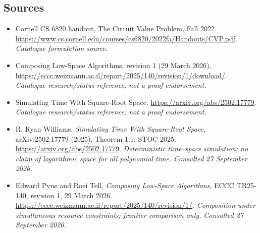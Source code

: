 \documentclass[11pt,a4paper]{article}
\numberwithin{equation}{section}
\begin{document}
\subsection{Sources}
\begin{itemize}\raggedright
\item[\textnormal{[S1]}]\hypertarget{source:statement:1}{} Cornell CS 6820 handout, The Circuit Value Problem, Fall 2022.
\url{https://www.cs.cornell.edu/courses/cs6820/2022fa/Handouts/CVP.pdf}.
{\small\textit{Catalogue formulation source.}}
\item[\textnormal{[S2]}]\hypertarget{source:statement:2}{} Composing Low-Space Algorithms, revision 1 (29 March 2026).
\url{https://eccc.weizmann.ac.il/report/2025/140/revision/1/download/}.
{\small\textit{Catalogue research/status reference; not a proof endorsement.}}
\item[\textnormal{[S3]}]\hypertarget{source:statement:3}{} Simulating Time With Square-Root Space.
\url{https://arxiv.org/abs/2502.17779}.
{\small\textit{Catalogue research/status reference; not a proof endorsement.}}

\item[\textnormal{[E1]}]\hypertarget{extra:statement:1}{} R. Ryan Williams, \emph{Simulating Time With Square-Root Space}, arXiv:2502.17779 (2025), Theorem 1.1; STOC 2025.
\url{https://arxiv.org/abs/2502.17779}.
{\small\textit{Deterministic time--space simulation; no claim of logarithmic space for all polynomial time. Consulted 27 September 2026.}}
\item[\textnormal{[E2]}]\hypertarget{extra:statement:2}{} Edward Pyne and Roei Tell, \emph{Composing Low-Space Algorithms}, ECCC TR25-140, revision 1, 29 March 2026.
\url{https://eccc.weizmann.ac.il/report/2025/140/revision/1/}.
{\small\textit{Composition under simultaneous resource constraints; frontier comparison only. Consulted 27 September 2026.}}
\end{itemize}
\end{document}
